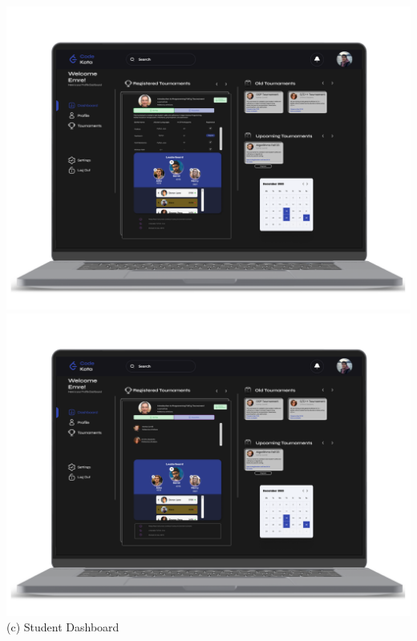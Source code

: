 \begin{center}
    \includegraphics[scale=0.13]{Images/ui-ux/student_dashboard_1.png}
    \includegraphics[scale=0.13]{Images/ui-ux/student_dashboard_2.png}
            (c) Student Dashboard
\end{center}
